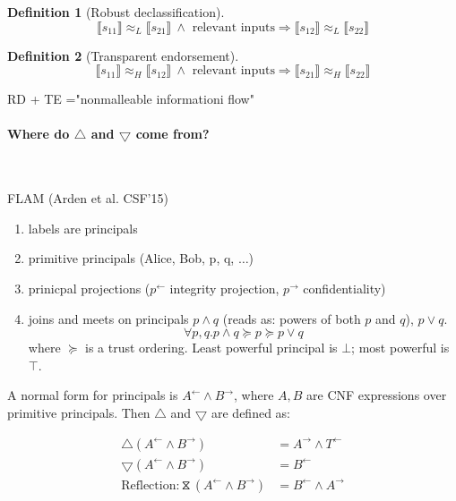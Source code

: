 \documentclass{article}
\newtheorem{definition}{Definition}[theorem]
\newcommand{\la}{^{\leftarrow}}
\newcommand{\ra}{^{\rightarrow}}
\newcommand{\refl}{\hourglass}
\begin{document}

\begin{definition}[Robust declassification]  
\begin{equation*}
  \llbracket s_{11} \rrbracket \approx_L \llbracket s_{21} \rrbracket \ \land \text{ relevant inputs} \Rightarrow \llbracket s_{12} \rrbracket \approx_L \llbracket s_{22} \rrbracket 
\end{equation*}
\end{definition}


\begin{definition}[Transparent endorsement]
\begin{equation*}
  \llbracket s_{11} \rrbracket \approx_H \llbracket s_{12} \rrbracket \ \land \text{ relevant inputs} \Rightarrow \llbracket s_{21} \rrbracket \approx_H \llbracket s_{22} \rrbracket
\end{equation*}  
\end{definition}  

RD + TE ="nonmalleable informationi flow"

\paragraph{Where do $\bigtriangleup$ and $\bigtriangledown$ come from?}\ 

FLAM (Arden et al. CSF'15)
\begin{enumerate}
    \item labels are principals
    \item primitive principals (Alice, Bob, p, q, $\ldots$)
    \item prinicpal projections ($p^{\leftarrow}$ integrity projection, $p^{\rightarrow}$ confidentiality)
    \item joins and meets on principals $p \land q$ (reads as: powers of both $p$ and $q$), $p \lor q$.
      \begin{equation*}
        \forall p,q. p \land q \succeq p \succeq p \lor q
      \end{equation*}
where $\succeq$ is a trust ordering. Least powerful principal is $\bot$; most powerful is $\top$. %
\end{enumerate}

A normal form for principals is $A^{\leftarrow} \land B^{\rightarrow}$, where $A,B$ are CNF expressions over primitive principals. Then $\bigtriangleup$ and $\bigtriangledown$ are defined as:

\begin{align*}
  \bigtriangleup (A \la \land B \ra) &= A \ra \land T \la \\
  \bigtriangledown (A \la \land B \ra) &= B \la \\
  \text{Reflection:} \refl (A \la \land B \ra) &= B \la \land A \ra                                         
\end{align*}
\end{document}
